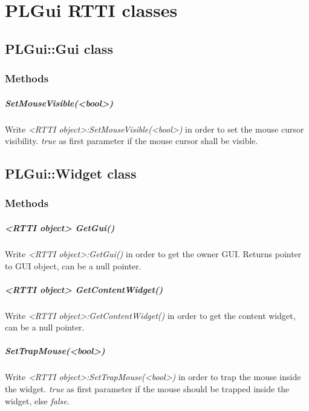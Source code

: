 \chapter{PLGui RTTI classes}




\section{PLGui::Gui class}


\subsection{Methods}

\paragraph{SetMouseVisible(<bool>)}
Write \emph{<RTTI object>:SetMouseVisible(<bool>)} in order to set the mouse cursor visibility. \emph{true} as first parameter if the mouse cursor shall be visible.




\section{PLGui::Widget class}


\subsection{Methods}

\paragraph{<RTTI object> GetGui()}
Write \emph{<RTTI object>:GetGui()} in order to get the owner GUI. Returns pointer to GUI object, can be a null pointer.

\paragraph{<RTTI object> GetContentWidget()}
Write \emph{<RTTI object>:GetContentWidget()} in order to get the content widget, can be a null pointer.

\paragraph{SetTrapMouse(<bool>)}
Write \emph{<RTTI object>:SetTrapMouse(<bool>)} in order to trap the mouse inside the widget. \emph{true} as first parameter if the mouse should be trapped inside the widget, else \emph{false}.





